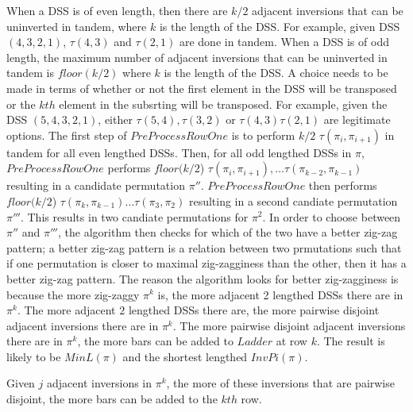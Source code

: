 When a DSS is of even length, then there are $k/2$ adjacent inversions that can be uninverted in tandem, where $k$ is the length of the DSS. 
For example, given DSS $(4,3,2,1)$, $\tau(4,3)$ and $\tau(2,1)$ are done in tandem. When a DSS is of odd length, the maximum 
number of adjacent inversions that can be uninverted in tandem is $floor(k/2)$ where $k$ is the length of the DSS. A choice 
needs to be made in terms of whether or not the first element in the DSS will be transposed or the $kth$ element in the subsrting will be 
transposed. For example, given the DSS $(5,4,3,2,1)$, either $\tau(5,4),\tau(3,2)$ or $\tau(4,3)\tau(2,1)$ are legitimate options. 
The first step of $PreProcessRowOne$ is to perform  $k/2$ $\tau(\pi_{i},\pi_{i+1})$ in tandem for all
even lengthed DSSs. Then, for all odd lengthed DSSs in $\pi$, $PreProcessRowOne$ performs $floor(k/2$) $\tau(\pi_{i}, \pi_{i+1}), \dots \tau(\pi_{k-2},\pi_{k-1})$
resulting in a candidate permutation $\pi''$. $PreProcessRowOne$ then performs $floor(k/2$) $\tau(\pi_{k},\pi_{k-1}) \dots \tau(\pi_{3},\pi_{2})$
resulting in a second candiate permutation $\pi'''$.
This results in two candiate permutations for $\pi^{2}$. In order to choose between $\pi''$ and $\pi'''$, 
the algorithm then checks for which of the two have a better zig-zag pattern; a better zig-zag 
pattern is a relation between two prmutations such that if one permutation is closer to maximal zig-zagginess 
than the other, then it has a better zig-zag pattern. The reason the algorithm looks 
for better zig-zagginess is because the more zig-zaggy $\pi^{k}$ is, the more adjacent
2 lengthed DSSs there are in $\pi^{k}$. The more adjacent $2$ lengthed DSSs there are, 
the more pairwise disjoint adjacent inversions there are in $\pi^{k}$. The more pairwise disjoint adjacent 
inversions there are in $\pi^{k}$, the more bars can be added to $Ladder$ at row $k$. 
The result is likely to be $MinL(\pi)$ and the shortest lengthed $InvPi(\pi)$.\par 
\begin{lemma}
    Given $j$ adjacent inversions in $\pi^{k}$, the more of these inversions that are pairwise disjoint, the more 
    bars can be added to the $kth$ row.
\end{lemma}
